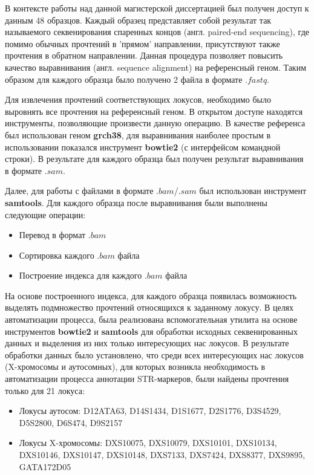 В контексте работы над данной магистерской диссертацией был получен доступ к данным 48 образцов.
Каждый образец представляет собой результат так называемого секвенирования спаренных концов
(англ. paired-end sequencing), где помимо обычных прочтений в 'прямом' направлении,
присутствуют также прочтения в обратном направлении. Данная процедура позволяет повысить качество
выравнивания (англ. sequence alignment) на референсный геном. Таким образом для каждого
образца было получено 2 файла в формате $.fastq$.

Для извлечения прочтений соответствующих локусов, необходимо было выровнять все прочтения на референсный геном.
В открытом доступе находятся инструменты, позволяющие произвести данную операцию.
В качестве референса был использован геном \textbf{grch38}, для выравнивания наиболее
простым в использовании показался инструмент \textbf{bowtie2} (с интерфейсом командной строки).
В результате для каждого образца был получен результат выравнивания в формате $.sam$.

Далее, для работы с файлами в формате $.bam$/$.sam$ был использован инструмент \textbf{samtools}.
Для каждого образца после выравнивания были выполнены следующие операции:
\begin{itemize}
\item Перевод в формат $.bam$
\item Сортировка каждого $.bam$ файла
\item Построение индекса для каждого $.bam$ файла
\end{itemize}

На основе построенного индекса, для каждого образца появилась возможность выделять подмножество
прочтений относящихся к заданному локусу. В целях автоматизации процесса, была реализована
вспомогательная утилита на основе инструментов \textbf{bowtie2} и \textbf{samtools} для
обработки исходных секвенированных данных и выделения из них только интересующих нас локусов.
В результате обработки данных было установлено, что среди всех интересующих нас локусов
(X-хромосомы и аутосомных), для которых возникла необходимость в автоматизации процесса аннотации
STR-маркеров, были найдены прочтения только для 21 локуса:
\begin{itemize}
\item Локусы аутосом: D12ATA63, D14S1434, D1S1677, D2S1776, D3S4529, D5S2800, D6S474, D9S2157
\item Локусы X-хромосомы: DXS10075, DXS10079, DXS10101, DXS10134, DXS10146, DXS10147, DXS10148, DXS7133, DXS7424, DXS8377, DXS9895, GATA172D05
\end{itemize}

